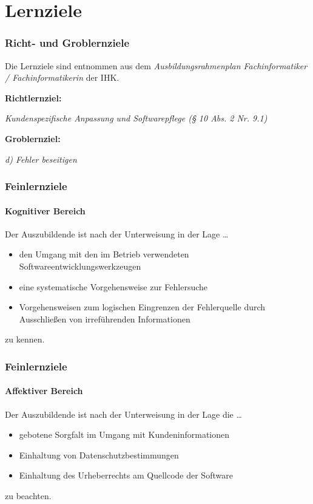 \documentclass{beamer}
\begin{document}
\section{Lernziele}

\setcounter{subsection}{1}
\begin{frame}
  \frametitle{Richt- und Groblernziele}
   Die Lernziele sind entnommen aus dem \emph{Ausbildungsrahmenplan Fachinformatiker / Fachinformatikerin} der IHK.
   
   \textbf{Richtlernziel:}
   
   \emph{Kundenspezifische Anpassung und Softwarepflege (§ 10 Abs. 2 Nr. 9.1)}
   
   \textbf{Groblernziel:}
   
   \emph{d) Fehler beseitigen}
\end{frame}

\setcounter{subsection}{1}
\begin{frame}
  \frametitle{Feinlernziele}
  \framesubtitle{Kognitiver Bereich}
    Der Auszubildende ist nach der Unterweisung in der Lage \ldots

    \begin{itemize}
      \item{den Umgang mit den im Betrieb verwendeten Softwareentwicklungswerkzeugen}
      \item{eine systematische Vorgehensweise zur Fehlersuche}
      \item{Vorgehensweisen zum logischen Eingrenzen der Fehlerquelle durch Ausschließen von irreführenden Informationen}
    \end{itemize}

    zu kennen.
\end{frame}

\setcounter{subsection}{1}
\begin{frame}
  \frametitle{Feinlernziele}
  \framesubtitle{Affektiver Bereich}
    Der Auszubildende ist nach der Unterweisung in der Lage die \ldots

    \begin{itemize}
      \item{gebotene Sorgfalt im Umgang mit Kundeninformationen}
      \item{Einhaltung von Datenschutzbestimmungen}
      \item{Einhaltung des Urheberrechts am Quellcode der Software}
    \end{itemize}

    zu beachten.
\end{frame}
\end{document}
